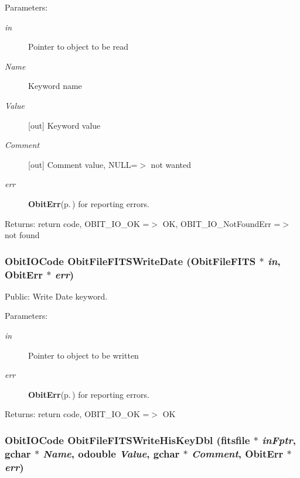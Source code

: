 \begin{Desc}
\item[Parameters:]
\begin{description}
\item[{\em in}]Pointer to object to be read \item[{\em Name}]Keyword name \item[{\em Value}][out] Keyword value \item[{\em Comment}][out] Comment value, NULL=$>$ not wanted \item[{\em err}]{\bf Obit\-Err}{\rm (p.\,\pageref{structObitErr})} for reporting errors. \end{description}
\end{Desc}
\begin{Desc}
\item[Returns:]return code, OBIT\_\-IO\_\-OK =$>$ OK, OBIT\_\-IO\_\-Not\-Found\-Err =$>$ not found \end{Desc}
\subsubsection{\setlength{\rightskip}{0pt plus 5cm}Obit\-IOCode Obit\-File\-FITSWrite\-Date ({\bf Obit\-File\-FITS} $\ast$ {\em in}, {\bf Obit\-Err} $\ast$ {\em err})}\label{ObitFileFITS_8h_a27}


Public: Write Date keyword. 

\begin{Desc}
\item[Parameters:]
\begin{description}
\item[{\em in}]Pointer to object to be written \item[{\em err}]{\bf Obit\-Err}{\rm (p.\,\pageref{structObitErr})} for reporting errors. \end{description}
\end{Desc}
\begin{Desc}
\item[Returns:]return code, OBIT\_\-IO\_\-OK =$>$ OK \end{Desc}
\subsubsection{\setlength{\rightskip}{0pt plus 5cm}Obit\-IOCode Obit\-File\-FITSWrite\-His\-Key\-Dbl (fitsfile $\ast$ {\em in\-Fptr}, gchar $\ast$ {\em Name}, {\bf odouble} {\em Value}, gchar $\ast$ {\em Comment}, {\bf Obit\-Err} $\ast$ {\em err})}\label{ObitFileFITS_8h_a25}


